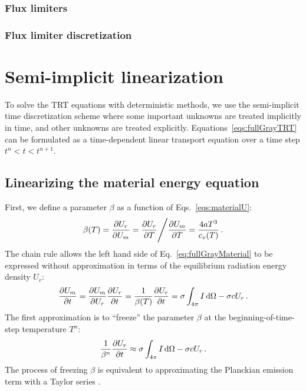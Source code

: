 \subsubsection{Flux limiters}

\subsubsection{Flux limiter discretization}
\cite{Ols2007}

\section{Semi-implicit linearization}

To solve the TRT equations with deterministic methods, we use the
semi-implicit time
discretization scheme \cite{Kno1999a,Kno2001,Low2004} where some important
unknowns are treated implicitly in
time, and other unknowns are treated explicitly. 
Equations~\eqref{eqs:fullGrayTRT} can be formulated as a time-dependent linear
transport equation over a time step $t^n < t < t^{n+1}$.

\subsection{Linearizing the material energy equation}
First, we define a parameter $\beta$ as a function of Eqs.~\eqref{eqs:materialU}:
\begin{equation} \label{eq:beta}
  \beta(T) = \frac{\partial U_r}{\partial U_m} 
  = \frac{\partial U_r}{\partial T} \Bigg/ \frac{\partial U_m}{\partial T}
  = \frac{4 a T^3}{c_v(T)} \,.
\end{equation}
The chain rule allows the left hand side of Eq.~\eqref{eq:fullGrayMaterial} to be
expressed without approximation in terms of the equilibrium radiation energy
density $U_r$:
\begin{equation*}
  \frac{\partial U_m}{\partial t} = \frac{\partial U_m}{\partial U_r} \frac{\partial U_r}{\partial t} = \frac{1}{\beta(T)}
  \frac{\partial U_r}{\partial t} = \sigma \int_{4\pi}  I \mathop{}\!\mathrm{d} \Omega - \sigma c U_r \,.
\end{equation*}
The first approximation is to ``freeze'' the parameter $\beta$ at the beginning-of-time-step temperature $T^n$:
\begin{equation}\label{eq:frozenBeta}
  \frac{1}{\beta^n}
  \frac{\partial U_r}{\partial t} \approx \sigma \int_{4\pi}  I \mathop{}\!\mathrm{d} \Omega - \sigma c U_r \,.
\end{equation}
The process of freezing $\beta$ is equivalent to approximating the
Planckian emission term with a Taylor series \cite{Kno2007}.

